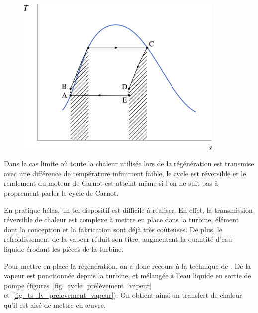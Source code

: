 		\begin{figure}
			\begin{center}
				\includegraphics[width=10cm]{images/ts_lv_regeneration.png}
			\end{center}
			\label{fig_ts_lv_regeneration}
		\end{figure}


		Dans le cas limite où toute la chaleur utilisée lors de la régénération est transmise avec une différence de température infiniment faible, le cycle est réversible et le rendement du moteur de Carnot est atteint même si l’on ne suit pas à proprement parler le cycle de Carnot.

		En pratique hélas, un tel dispositif est difficile à réaliser. En effet, la transmission réversible de chaleur est complexe à mettre en place dans la turbine, élément dont la conception et la fabrication sont déjà très coûteuses. De plus, le refroidissement de la vapeur réduit son titre, augmentant la quantité d’eau liquide érodant les pièces de la turbine.

		Pour mettre en place la régénération, on a donc recours à la technique de . De la vapeur est ponctionnée depuis la turbine, et mélangée à l’eau liquide en sortie de pompe (figures~\ref{fig_cycle_prélèvement_vapeur} et~\ref{fig_ts_lv_prelevement_vapeur}). On obtient ainsi un transfert de chaleur qu’il est aisé de mettre en œuvre.

